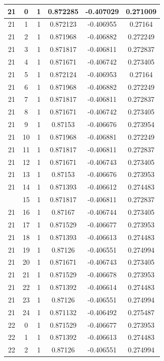 \documentclass[12pt,a4paper]{article}
\numberwithin{equation}{section}
\numberwithin{figure}{section}
\numberwithin{table}{section}
\begin{document}
\begin{longtable}{|c|c|c|c|c|c|}
21 & 0 & 1 & 0.872285 & -0.407029 & 0.271009 \\ \hline
21 & 1 & 1 & 0.872123 & -0.406955 & 0.27164 \\ \hline
21 & 2 & 1 & 0.871968 & -0.406882 & 0.272249 \\ \hline
21 & 3 & 1 & 0.871817 & -0.406811 & 0.272837 \\ \hline
21 & 4 & 1 & 0.871671 & -0.406742 & 0.273405 \\ \hline
21 & 5 & 1 & 0.872124 & -0.406953 & 0.27164 \\ \hline
21 & 6 & 1 & 0.871968 & -0.406882 & 0.272249 \\ \hline
21 & 7 & 1 & 0.871817 & -0.406811 & 0.272837 \\ \hline
21 & 8 & 1 & 0.871671 & -0.406742 & 0.273405 \\ \hline
21 & 9 & 1 & 0.87153 & -0.406676 & 0.273954 \\ \hline
21 & 10 & 1 & 0.871968 & -0.406881 & 0.272249 \\ \hline
21 & 11 & 1 & 0.871817 & -0.406811 & 0.272837 \\ \hline
21 & 12 & 1 & 0.871671 & -0.406743 & 0.273405 \\ \hline
21 & 13 & 1 & 0.87153 & -0.406676 & 0.273953 \\ \hline
21 & 14 & 1 & 0.871393 & -0.406612 & 0.274483 \\ \hline
\pagebreak
21 & 15 & 1 & 0.871817 & -0.406811 & 0.272837 \\ \hline
21 & 16 & 1 & 0.87167 & -0.406744 & 0.273405 \\ \hline
21 & 17 & 1 & 0.871529 & -0.406677 & 0.273953 \\ \hline
21 & 18 & 1 & 0.871393 & -0.406613 & 0.274483 \\ \hline
21 & 19 & 1 & 0.87126 & -0.406551 & 0.274994 \\ \hline
21 & 20 & 1 & 0.871671 & -0.406743 & 0.273405 \\ \hline
21 & 21 & 1 & 0.871529 & -0.406678 & 0.273953 \\ \hline
21 & 22 & 1 & 0.871392 & -0.406614 & 0.274483 \\ \hline
21 & 23 & 1 & 0.87126 & -0.406551 & 0.274994 \\ \hline
21 & 24 & 1 & 0.871132 & -0.406492 & 0.275487 \\ \hline
22 & 0 & 1 & 0.871529 & -0.406677 & 0.273953 \\ \hline
22 & 1 & 1 & 0.871392 & -0.406613 & 0.274483 \\ \hline
22 & 2 & 1 & 0.87126 & -0.406551 & 0.274994 \\ \hline

\end{longtable}
\end{document}
